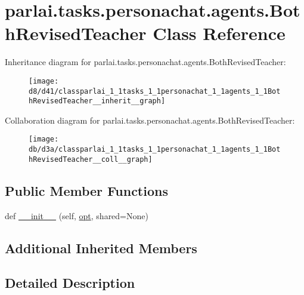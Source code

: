 \hypertarget{classparlai_1_1tasks_1_1personachat_1_1agents_1_1BothRevisedTeacher}{}\section{parlai.\+tasks.\+personachat.\+agents.\+Both\+Revised\+Teacher Class Reference}
\label{classparlai_1_1tasks_1_1personachat_1_1agents_1_1BothRevisedTeacher}


Inheritance diagram for parlai.\+tasks.\+personachat.\+agents.\+Both\+Revised\+Teacher\+:\nopagebreak
\begin{figure}[H]
\begin{center}
\leavevmode
\texttt{[image: d8/d41/classparlai\_1\_1tasks\_1\_1personachat\_1\_1agents\_1\_1BothRevisedTeacher\_\_inherit\_\_graph]}
\end{center}
\end{figure}


Collaboration diagram for parlai.\+tasks.\+personachat.\+agents.\+Both\+Revised\+Teacher\+:\nopagebreak
\begin{figure}[H]
\begin{center}
\leavevmode
\texttt{[image: db/d3a/classparlai\_1\_1tasks\_1\_1personachat\_1\_1agents\_1\_1BothRevisedTeacher\_\_coll\_\_graph]}
\end{center}
\end{figure}
\subsection*{Public Member Functions}
\begin{DoxyCompactItemize}
\item 
def \hyperlink{classparlai_1_1tasks_1_1personachat_1_1agents_1_1BothRevisedTeacher_ad79201b85afa5bfebc40d962550493f8}{\+\_\+\+\_\+init\+\_\+\+\_\+} (self, \hyperlink{classparlai_1_1core_1_1teachers_1_1FbDialogTeacher_af7a9ec497b9cd0292d7b8fa220da7c28}{opt}, shared=None)
\end{DoxyCompactItemize}
\subsection*{Additional Inherited Members}


\subsection{Detailed Description}


